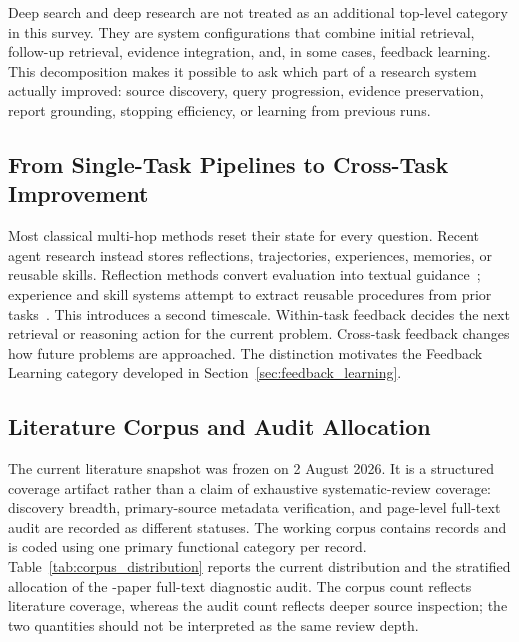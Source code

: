 Deep search and deep research are not treated as an additional top-level category in this survey. They are system configurations that combine initial retrieval, follow-up retrieval, evidence integration, and, in some cases, feedback learning. This decomposition makes it possible to ask which part of a research system actually improved: source discovery, query progression, evidence preservation, report grounding, stopping efficiency, or learning from previous runs.

\subsection{From Single-Task Pipelines to Cross-Task Improvement}

Most classical multi-hop methods reset their state for every question. Recent agent research instead stores reflections, trajectories, experiences, memories, or reusable skills. Reflection methods convert evaluation into textual guidance~\cite{shinn2023reflexion,madaan2023selfrefine,gou2024critic}; experience and skill systems attempt to extract reusable procedures from prior tasks~\cite{wang2023voyager}. This introduces a second timescale. Within-task feedback decides the next retrieval or reasoning action for the current problem. Cross-task feedback changes how future problems are approached. The distinction motivates the Feedback Learning category developed in Section~\ref{sec:feedback_learning}.

\subsection{Literature Corpus and Audit Allocation}

The current literature snapshot was frozen on 2 August 2026. It is a structured coverage artifact rather than a claim of exhaustive systematic-review coverage: discovery breadth, primary-source metadata verification, and page-level full-text audit are recorded as different statuses. The working corpus contains \CorpusSize{} records and is coded using one primary functional category per record. Table~\ref{tab:corpus_distribution} reports the current distribution and the stratified allocation of the \AuditSize-paper full-text diagnostic audit. The corpus count reflects literature coverage, whereas the audit count reflects deeper source inspection; the two quantities should not be interpreted as the same review depth.

